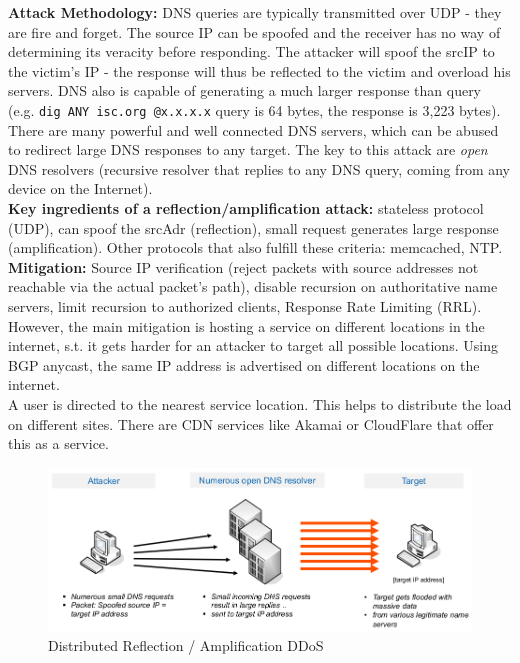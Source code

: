 \documentclass[11pt,oneside,a4paper]{article}
\begin{document}
\textbf{Attack Methodology:} DNS queries are typically transmitted over UDP - they are fire and forget. The source IP can be spoofed and the receiver has no way of determining its veracity before responding. The attacker will spoof the srcIP to the victim's IP - the response will thus be reflected to the victim and overload his servers. DNS also is capable of generating a much larger response than query (e.g. \texttt{dig ANY isc.org @x.x.x.x} query is 64 bytes, the response is 3,223 bytes). There are many powerful and well connected DNS servers, which can be abused to redirect large DNS responses to any target. The key to this attack are \textit{open} DNS resolvers (recursive resolver that replies to any DNS query, coming from any device
on the Internet).\\
\textbf{Key ingredients of a reflection/amplification attack:} stateless protocol (UDP), can spoof the srcAdr (reflection), small request generates large response (amplification). Other protocols that also fulfill these criteria: memcached, NTP.\\
\textbf{Mitigation:} Source IP verification (reject packets with source addresses not reachable via the actual packet’s path), disable recursion on authoritative name servers, limit recursion to authorized clients, Response Rate Limiting (RRL).\\
However, the main mitigation is hosting a service on different locations in the internet, s.t. it gets harder for an attacker to target all possible locations. Using BGP anycast, the same IP address is advertised on different locations on the internet.\\
A user is directed to the nearest service location. This helps to distribute the load on different sites. There are CDN services like Akamai or CloudFlare that offer this as a service.

\begin{figure}[hb]
	\centering
	\includegraphics[width=0.7\linewidth]{figures/dns_reflection_amplification_ddos}
	\caption{Distributed Reflection / Amplification DDoS}
	\label{fig:dnsreflectionamplificationddos}
\end{figure}
\end{document}
